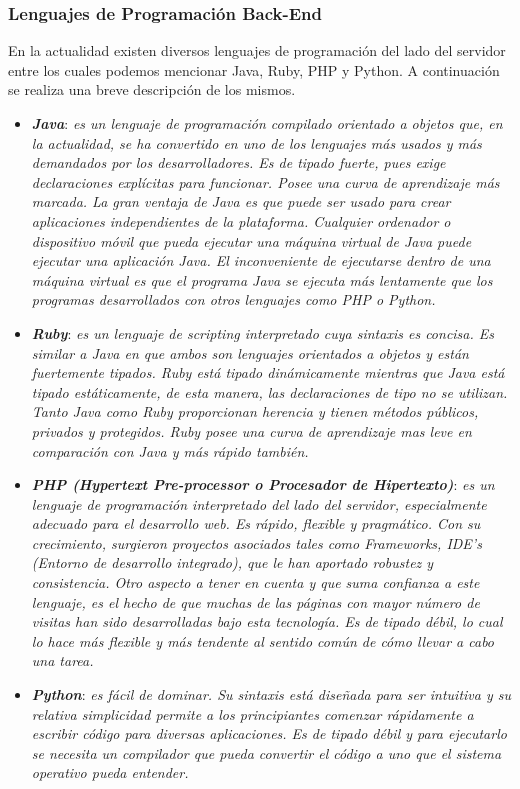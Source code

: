 \documentclass[11pt,oneside]{book}
\begin{document}
\subsubsection{Lenguajes de Programación Back-End}
En la actualidad existen diversos lenguajes de programación del lado del servidor entre los cuales podemos mencionar Java, Ruby, PHP y Python. A continuación se realiza una breve descripción de los mismos. 
\begin{itemize}
\item \textit{\textbf{Java}}: \textit{es un lenguaje de programación compilado orientado a objetos que, en la actualidad, se ha convertido en uno de los lenguajes más usados y más demandados por los desarrolladores. Es de tipado fuerte, pues exige declaraciones explícitas para funcionar. Posee una curva de aprendizaje más marcada. La gran ventaja de Java es que puede ser usado para crear aplicaciones independientes de la plataforma. Cualquier ordenador o dispositivo móvil que pueda ejecutar una máquina virtual de Java puede ejecutar una aplicación Java. El inconveniente de ejecutarse dentro de una máquina virtual es que el programa Java se ejecuta más lentamente que los programas desarrollados con otros lenguajes como PHP o Python.}

\item \textit{\textbf{Ruby}}: \textit{es un lenguaje de scripting interpretado cuya sintaxis es concisa. Es similar a Java en que ambos son lenguajes orientados a objetos y están fuertemente tipados. Ruby está tipado dinámicamente mientras que Java está tipado estáticamente, de esta manera, las declaraciones de tipo no se utilizan. Tanto Java como Ruby proporcionan herencia y tienen métodos públicos, privados y protegidos. Ruby posee una curva de aprendizaje mas leve en comparación con Java y más rápido también.}

\item \textit{\textbf{PHP (Hypertext Pre-processor o Procesador de Hipertexto)}}: \textit{es un lenguaje de programación interpretado del lado del servidor, especialmente adecuado para el desarrollo web. Es rápido, flexible y pragmático. Con su crecimiento, surgieron proyectos asociados tales como Frameworks, IDE’s (Entorno de desarrollo integrado), que le han aportado robustez y consistencia. Otro aspecto a tener en cuenta y que suma confianza a este lenguaje, es el hecho de que muchas de las páginas con mayor número de visitas han sido desarrolladas bajo esta tecnología. Es de tipado débil, lo cual lo hace más flexible y más tendente al sentido común de cómo llevar a cabo una tarea.}

\item \textit{\textbf{Python}}: \textit{es fácil de dominar. Su sintaxis está diseñada para ser intuitiva y su relativa simplicidad permite a los principiantes comenzar rápidamente a escribir código para diversas aplicaciones. Es de tipado débil y para ejecutarlo se necesita un compilador que pueda convertir el código a uno que el sistema operativo pueda entender.}
\end{itemize}
\end{document}
